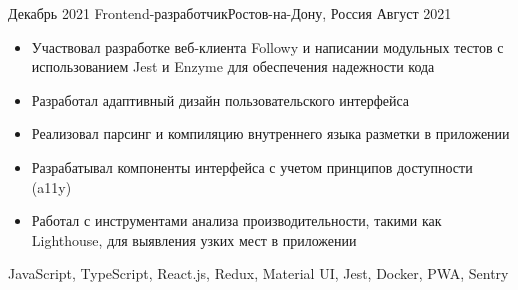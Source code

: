 
\begin{experiences}
  \experience
    {Декабрь 2021} {Frontend-разработчик}{}{Ростов-на-Дону, Россия}
    {Август 2021}  {
                     \begin{itemize}
                     \item Участвовал разработке веб-клиента Followy и написании модульных тестов с использованием Jest и Enzyme для обеспечения надежности кода
                     \item Разработал адаптивный дизайн пользовательского интерфейса
                     \item Реализовал парсинг и компиляцию внутреннего языка разметки в приложении
                     \item Разрабатывал компоненты интерфейса с учетом принципов доступности (a11y)
                     \item Работал с инструментами анализа производительности, такими как Lighthouse, для выявления узких мест в приложении
                     \end{itemize}
                  }
                  {JavaScript, TypeScript, React.js, Redux, Material UI, Jest, Docker, PWA, Sentry}
\end{experiences}
